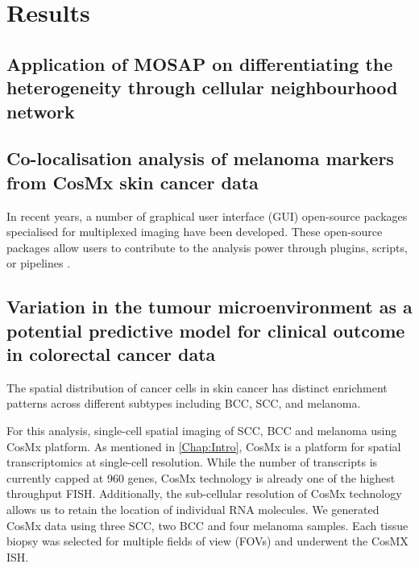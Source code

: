 \section{Results}
\subsection{Application of MOSAP on differentiating the heterogeneity through cellular neighbourhood network}
\subsection{Co-localisation analysis of melanoma markers from CosMx skin cancer data}
In recent years, a number of graphical user interface (GUI) open-source packages specialised for multiplexed imaging have been developed. These open-source packages allow users to contribute to the analysis power through plugins, scripts, or pipelines \cite{bankhead2017qupath,schneider2012nih}.  
\subsection{Variation in the tumour microenvironment as a potential predictive model for clinical outcome in colorectal cancer data}

The spatial distribution of cancer cells in skin cancer has distinct enrichment patterns across different subtypes including BCC, SCC, and melanoma. 


For this analysis, single-cell spatial imaging of SCC, BCC and melanoma using CosMx platform. As mentioned in \ref{Chap:Intro}, CosMx is a platform for spatial transcriptomics at single-cell resolution. While the number of transcripts is currently capped at 960 genes, CosMx technology is already one of the highest throughput FISH. Additionally, the sub-cellular resolution of CosMx technology allows us to retain the location of individual RNA molecules. We generated CosMx data using three SCC, two BCC and four melanoma samples. Each tissue biopsy was selected for multiple fields of view (FOVs) and underwent the CosMX ISH.  

